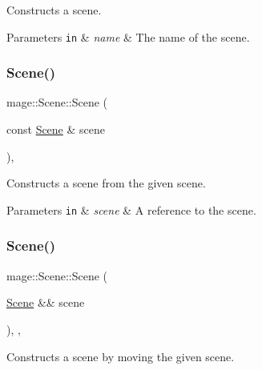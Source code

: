 Constructs a scene.


\begin{DoxyParams}[1]{Parameters}
\mbox{\tt in}  & {\em name} & The name of the scene. \\
\hline
\end{DoxyParams}
\hypertarget{classmage_1_1_scene_a88d83ccb2e10549d5370f850b2b4c228}{}\label{classmage_1_1_scene_a88d83ccb2e10549d5370f850b2b4c228} 
\subsubsection{\texorpdfstring{Scene()}{Scene()}\hspace{0.1cm}{\footnotesize\ttfamily [2/3]}}
{\footnotesize\ttfamily mage\+::\+Scene\+::\+Scene (\begin{DoxyParamCaption}\item[{const \hyperlink{classmage_1_1_scene}{Scene} \&}]{scene }\end{DoxyParamCaption})\hspace{0.3cm}{\ttfamily [protected]}, {\ttfamily [delete]}}

Constructs a scene from the given scene.


\begin{DoxyParams}[1]{Parameters}
\mbox{\tt in}  & {\em scene} & A reference to the scene. \\
\hline
\end{DoxyParams}
\hypertarget{classmage_1_1_scene_afeae10a3a50bf1d624faa6bd0bf33a7d}{}\label{classmage_1_1_scene_afeae10a3a50bf1d624faa6bd0bf33a7d} 
\subsubsection{\texorpdfstring{Scene()}{Scene()}\hspace{0.1cm}{\footnotesize\ttfamily [3/3]}}
{\footnotesize\ttfamily mage\+::\+Scene\+::\+Scene (\begin{DoxyParamCaption}\item[{\hyperlink{classmage_1_1_scene}{Scene} \&\&}]{scene }\end{DoxyParamCaption})\hspace{0.3cm}{\ttfamily [protected]}, {\ttfamily [default]}, {\ttfamily [noexcept]}}

Constructs a scene by moving the given scene.


